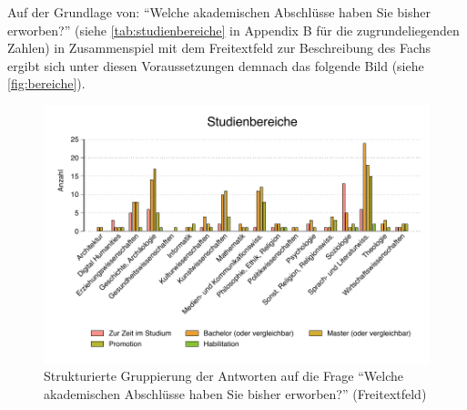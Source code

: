 \documentclass{scrartcl}
\begin{document}
Auf der Grundlage von:
\enquote{Welche akademischen Abschlüsse haben Sie bisher erworben?} (siehe \autoref{tab:studienbereiche} in Appendix B für die zugrundeliegenden Zahlen) in Zusammenspiel mit dem Freitextfeld zur Beschreibung des Fachs ergibt sich unter diesen Voraussetzungen demnach das folgende Bild (siehe \autoref{fig:bereiche}).

\begin{figure}[t]
   \includegraphics[width=1\textwidth]{bereiche.pdf}
   \caption{Strukturierte Gruppierung der Antworten auf die Frage \enquote{Welche akademischen Abschlüsse haben Sie bisher erworben?} (Freitextfeld)}
   \label{fig:bereiche}
\end{figure}
\end{document}

